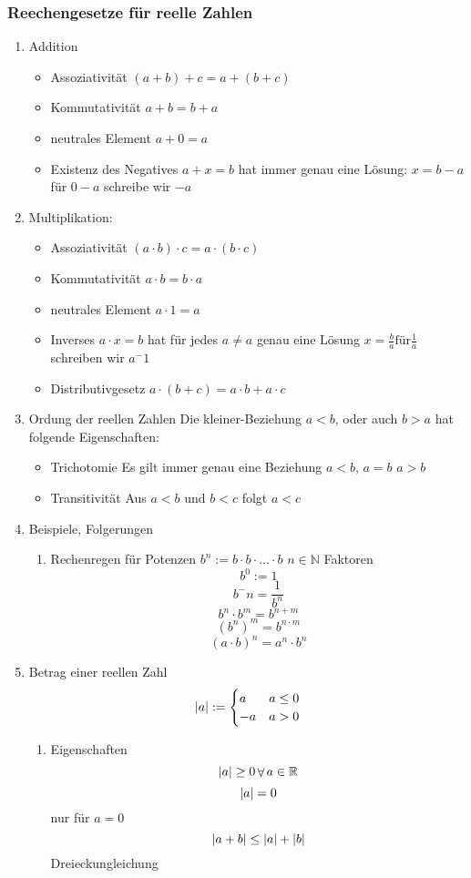 \documentclass[11pt]{article}
\DeclarePairedDelimiter\abs{\lvert}{\rvert}%
\DeclareMathOperator{\Forall}{\forall}
\begin{document}
\subsubsection{Reechengesetze für reelle Zahlen}
\label{sec-2-2-1}
\begin{enumerate}
\item Addition
\label{sec-2-2-1-1}
\begin{itemize}
\item Assoziativität $(a+b) + c = a + (b + c)$
\item Kommutativität $a + b = b + a$
\item neutrales Element $a + 0 = a$
\item Existenz des Negatives $a + x = b$ hat immer genau eine Lösung: $x = b - a$ für $0 - a$ schreibe wir $-a$
\end{itemize}
\item Multiplikation:
\label{sec-2-2-1-2}
\begin{itemize}
\item Assoziativität $(a \cdot b) \cdot c = a \cdot (b \cdot c)$
\item Kommutativität $a \cdot b = b \cdot a$
\item neutrales Element $a \cdot 1 = a$
\item Inverses $a \cdot x = b$ hat für jedes $a \neq a$ genau eine Lösung $x = \frac{b}{a} \text{für} \frac{1}{a}$ schreiben wir $a^-1$
\item Distributivgesetz $a \cdot (b + c) = a\cdot b + a\cdot c$
\end{itemize}
\item Ordung der reellen Zahlen
\label{sec-2-2-1-3}
Die kleiner-Beziehung $a<b$, oder auch $b > a$ hat folgende Eigenschaften:
\begin{itemize}
\item Trichotomie Es gilt immer genau eine Beziehung
$a < b$, $a = b$ $a > b$
\item Transitivität Aus $a < b$ und $b < c$ folgt $a < c$
\end{itemize}
\item Beispiele, Folgerungen
\label{sec-2-2-1-4}
\begin{enumerate}
\item Rechenregen für Potenzen
\label{sec-2-2-1-4-1}
$b^n := b\cdot b \cdot \ldots \cdot b$ $n\in \mathbb{N}$ Faktoren
\[b^0 := 1\]
\[b^-n = \frac{1}{b^n}\]
\[b^n \cdot b^m = b^{n+m}\]
\[(b^n)^m = b^{n\cdot m}\]
\[(a\cdot b)^n = a^n \cdot b^n\]
\end{enumerate}
\item Betrag einer reellen Zahl
\label{sec-2-2-1-5}
\[\abs{a} := \begin{cases} a & a \leq 0 \\ -a & a > 0 \end{cases} \]
\begin{enumerate}
\item Eigenschaften
\label{sec-2-2-1-5-1}
\[\abs{a} \geq 0 \Forall a\in\mathbb{R}\]
\[\abs{a} = 0\] nur für $a = 0$
\[\abs{a + b} \leq \abs{a} + \abs{b}\] Dreieckungleichung
\end{enumerate}
\end{enumerate}
\end{document}
